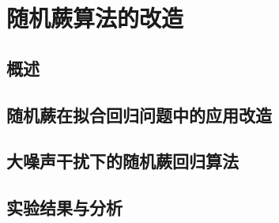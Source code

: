\chapter{随机蕨算法的改造}

\section{概述} 

\section{随机蕨在拟合回归问题中的应用改造}

\section{大噪声干扰下的随机蕨回归算法}

\section{实验结果与分析} %
